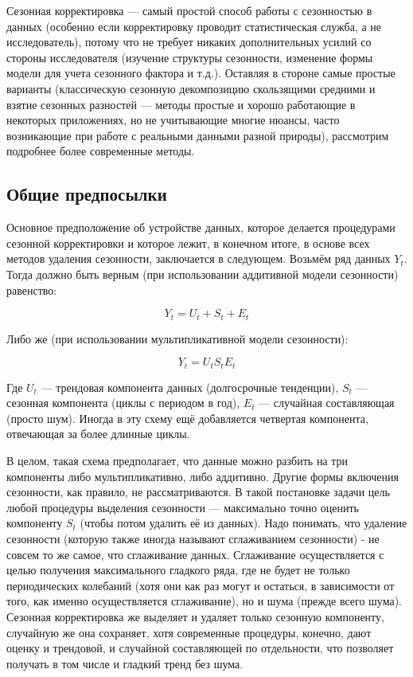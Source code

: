 \documentclass[final,pdftex]{../../template/epsilonj}\usepackage[]{graphicx}\usepackage[]{color}
\begin{document}
Сезонная корректировка --- самый простой способ работы с сезонностью в данных (особенно если корректировку проводит статистическая служба, а не исследователь), потому что не требует никаких дополнительных усилий со стороны исследователя (изучение структуры сезонности, изменение формы модели для учета сезонного фактора и т.д.). Оставляя в стороне самые простые варианты (классическую сезонную декомпозицию скользящими средними и взятие сезонных разностей --- методы простые и хорошо работающие в некоторых приложениях, но не учитывающие многие нюансы, часто возникающие при работе с реальными данными разной природы), рассмотрим подробнее более современные методы. 

\subsection{Общие предпосылки}

Основное предположение об устройстве данных, которое делается процедурами сезонной корректировки и которое лежит, в конечном итоге, в основе всех методов удаления сезонности, заключается в следующем. Возьмём ряд данных $Y_t$. Тогда должно быть верным (при использовании аддитивной модели сезонности) равенство:

\[
Y_t = U_t + S_t + E_t
\]

Либо же (при использовании мультипликативной модели сезонности):

\[ 
Y_t = U_t S_t E_t
\]

Где $U_t$ --- трендовая компонента данных (долгосрочные тенденции), $S_t$ --- сезонная компонента (циклы с периодом в год), $E_t$ --- случайная составляющая (просто шум). Иногда в эту схему ещё добавляется четвертая компонента, отвечающая за более длинные циклы. 

В целом, такая схема предполагает, что данные можно разбить на три компоненты либо мультипликативно, либо аддитивно. Другие формы включения сезонности, как правило, не рассматриваются. В такой постановке задачи цель любой процедуры выделения сезонности --- максимально точно оценить компоненту $S_t$ (чтобы потом удалить её из данных). Надо понимать, что удаление сезонности (которую также иногда называют сглаживанием сезонности) - не совсем то же самое, что сглаживание данных. Сглаживание осуществляется с целью получения максимального гладкого ряда, где не будет не только периодических колебаний (хотя они как раз могут и остаться, в зависимости от того, как именно осуществляется сглаживание), но и шума (прежде всего шума). Сезонная корректировка же выделяет и удаляет только сезонную компоненту, случайную же она сохраняет, хотя современные процедуры, конечно, дают оценку и трендовой, и случайной составляющей по отдельности, что позволяет получать в том числе и гладкий тренд без шума. 
\end{document}

